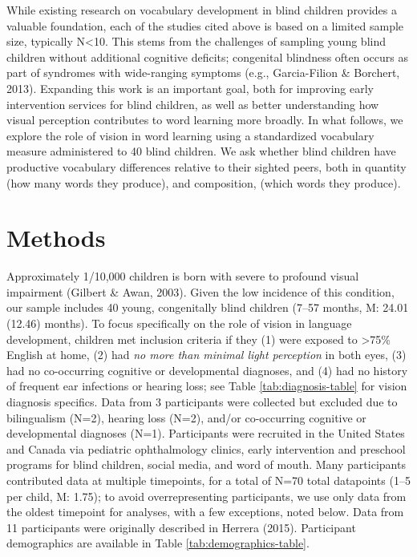 \documentclass[
  man,floatsintext]{apa6}
\begin{document}
While existing research on vocabulary development in blind children provides a valuable foundation, each of the studies cited above is based on a limited sample size, typically N\textless10. This stems from the challenges of sampling young blind children without additional cognitive deficits; congenital blindness often occurs as part of syndromes with wide-ranging symptoms (e.g., Garcia-Filion \& Borchert, 2013). Expanding this work is an important goal, both for improving early intervention services for blind children, as well as better understanding how visual perception contributes to word learning more broadly. In what follows, we explore the role of vision in word learning using a standardized vocabulary measure administered to 40 blind children. We ask whether blind children have productive vocabulary differences relative to their sighted peers, both in quantity (how many words they produce), and composition, (which words they produce).

\hypertarget{methods}{%
\section{Methods}\label{methods}}

Approximately 1/10,000 children is born with severe to profound visual impairment (Gilbert \& Awan, 2003). Given the low incidence of this condition, our sample includes 40 young, congenitally blind children (7--57 months, M: 24.01 (12.46) months). To focus specifically on the role of vision in language development, children met inclusion criteria if they (1) were exposed to \textgreater75\% English at home, (2) had \emph{no more than minimal light perception} in both eyes, (3) had no co-occurring cognitive or developmental diagnoses, and (4) had no history of frequent ear infections or hearing loss; see Table \ref{tab:diagnosis-table} for vision diagnosis specifics. Data from 3 participants were collected but excluded due to bilingualism (N=2), hearing loss (N=2), and/or co-occurring cognitive or developmental diagnoses (N=1). Participants were recruited in the United States and Canada via pediatric ophthalmology clinics, early intervention and preschool programs for blind children, social media, and word of mouth. Many participants contributed data at multiple timepoints, for a total of N=70 total datapoints (1--5 per child, M: 1.75); to avoid overrepresenting participants, we use only data from the oldest timepoint for analyses, with a few exceptions, noted below. Data from 11 participants were originally described in Herrera (2015). Participant demographics are available in Table \ref{tab:demographics-table}.
\end{document}
